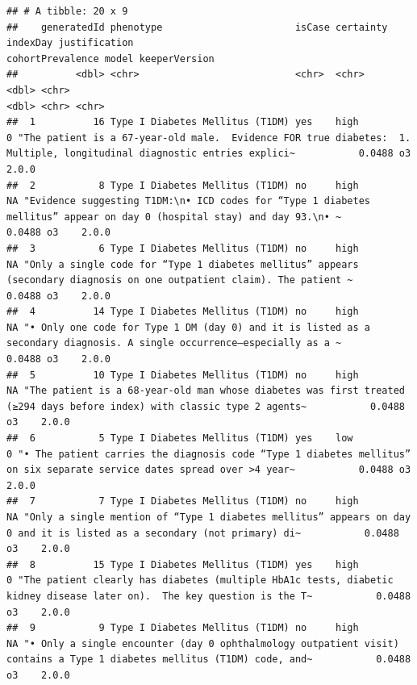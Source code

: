 \documentclass[
]{article}
\begin{document}
\begin{verbatim}
## # A tibble: 20 x 9
##    generatedId phenotype                       isCase certainty indexDay justification                                                                                                           cohortPrevalence model keeperVersion
##          <dbl> <chr>                           <chr>  <chr>        <dbl> <chr>                                                                                                                              <dbl> <chr> <chr>        
##  1          16 Type I Diabetes Mellitus (T1DM) yes    high             0 "The patient is a 67-year-old male.  Evidence FOR true diabetes:  1. Multiple, longitudinal diagnostic entries explici~           0.0488 o3    2.0.0        
##  2           8 Type I Diabetes Mellitus (T1DM) no     high            NA "Evidence suggesting T1DM:\n• ICD codes for “Type 1 diabetes mellitus” appear on day 0 (hospital stay) and day 93.\n• ~           0.0488 o3    2.0.0        
##  3           6 Type I Diabetes Mellitus (T1DM) no     high            NA "Only a single code for “Type 1 diabetes mellitus” appears (secondary diagnosis on one outpatient claim). The patient ~           0.0488 o3    2.0.0        
##  4          14 Type I Diabetes Mellitus (T1DM) no     high            NA "• Only one code for Type 1 DM (day 0) and it is listed as a secondary diagnosis. A single occurrence—especially as a ~           0.0488 o3    2.0.0        
##  5          10 Type I Diabetes Mellitus (T1DM) no     high            NA "The patient is a 68-year-old man whose diabetes was first treated (≥294 days before index) with classic type 2 agents~           0.0488 o3    2.0.0        
##  6           5 Type I Diabetes Mellitus (T1DM) yes    low              0 "• The patient carries the diagnosis code “Type 1 diabetes mellitus” on six separate service dates spread over >4 year~           0.0488 o3    2.0.0        
##  7           7 Type I Diabetes Mellitus (T1DM) no     high            NA "Only a single mention of “Type 1 diabetes mellitus” appears on day 0 and it is listed as a secondary (not primary) di~           0.0488 o3    2.0.0        
##  8          15 Type I Diabetes Mellitus (T1DM) yes    high             0 "The patient clearly has diabetes (multiple HbA1c tests, diabetic kidney disease later on).  The key question is the T~           0.0488 o3    2.0.0        
##  9           9 Type I Diabetes Mellitus (T1DM) no     high            NA "• Only a single encounter (day 0 ophthalmology outpatient visit) contains a Type 1 diabetes mellitus (T1DM) code, and~           0.0488 o3    2.0.0        

\end{verbatim}
\end{document}
